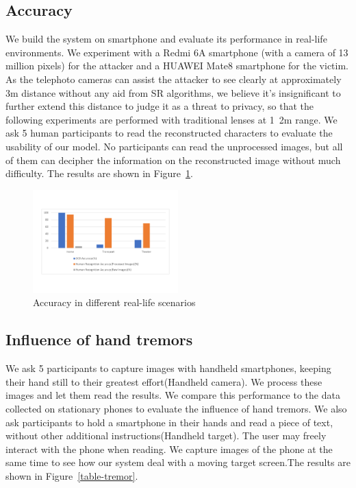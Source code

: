 \subsection{Accuracy}
We build the system on smartphone and evaluate its performance in real-life environments. We experiment with a Redmi 6A smartphone (with a camera of 13 million pixels) for the attacker and a HUAWEI Mate8 smartphone for the victim. As the telephoto cameras can assist the attacker to see clearly at approximately 3m distance without any aid from SR algorithms, we believe it's insignificant to further extend this distance to judge it as a threat to privacy, so that the following experiments are performed with traditional lenses at 1~2m range. We ask 5 human participants to read the reconstructed characters to evaluate the usability of our model. No participants can read the unprocessed images, but all of them can decipher the information on the reconstructed image without much difficulty. The results are shown in Figure~\ref{table-accuracy}.

\begin{figure}
 \centering
    \includegraphics[width=0.5\textwidth]{./pic/table5.pdf}
    \caption{Accuracy in different real-life scenarios}
	\label{table-accuracy}
\end{figure}

\subsection{Influence of hand tremors}
We ask 5 participants to capture images with handheld smartphones, keeping their hand still to their greatest effort(Handheld camera). We process these images and let them read the results. We compare this performance to the data collected on stationary phones to evaluate the influence of hand tremors.
We also ask participants to hold a smartphone in their hands and read a piece of text, without other additional instructions(Handheld target). The user may freely interact with the phone when reading. We capture images of the phone at the same time to see how our system deal with a moving target screen.The results are shown in Figure~\ref{table-tremor}.

